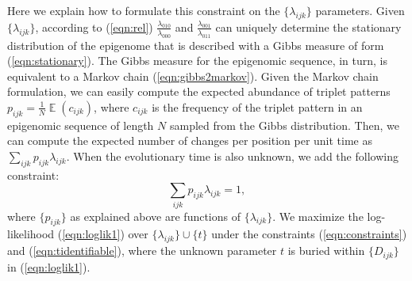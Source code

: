 \documentclass[11pt]{article}
\DeclareMathOperator{\E}{\mathbb{E}}
\begin{document}
Here we explain how to formulate this constraint on the
$\{\lambda_{ijk}\}$ parameters. Given $\{\lambda_{ijk}\}$, according
to (\ref{eqn:rel}) $\frac{\lambda_{010}}{\lambda_{000}}$ and
$\frac{\lambda_{001}}{\lambda_{011}}$ can uniquely determine the
stationary distribution of the epigenome that is described with a
Gibbs measure of form (\ref{eqn:stationary}).  The Gibbs measure for
the epigenomic sequence, in turn, is equivalent to a Markov chain
(\ref{eqn:gibbs2markov}). Given the Markov chain formulation, we can
easily compute the expected abundance of triplet patterns $p_{ijk} =
\frac{1}{N}\E(c_{ijk})$, where $c_{ijk}$ is the frequency of the
triplet pattern in an epigenomic sequence of length $N$ sampled from
the Gibbs distribution. Then, we can compute the expected number of
changes per position per unit time as
$\sum_{ijk}p_{ijk}\lambda_{ijk}$. When the evolutionary time is also 
unknown, we add the following constraint:
\begin{equation}\label{eqn:tidentifiable}
\sum_{ijk}p_{ijk}\lambda_{ijk} = 1, 
\end{equation}
where $\{p_{ijk}\}$ as explained above are functions of
$\{\lambda_{ijk}\}$.  We maximize the log-likelihood
(\ref{eqn:loglik1}) over $\{\lambda_{ijk}\}\cup\{t\}$ under the
constraints (\ref{eqn:constraints}) and (\ref{eqn:tidentifiable}),
where the unknown parameter $t$ is buried within $\{D_{ijk}\}$ in
(\ref{eqn:loglik1}).








\end{document}
